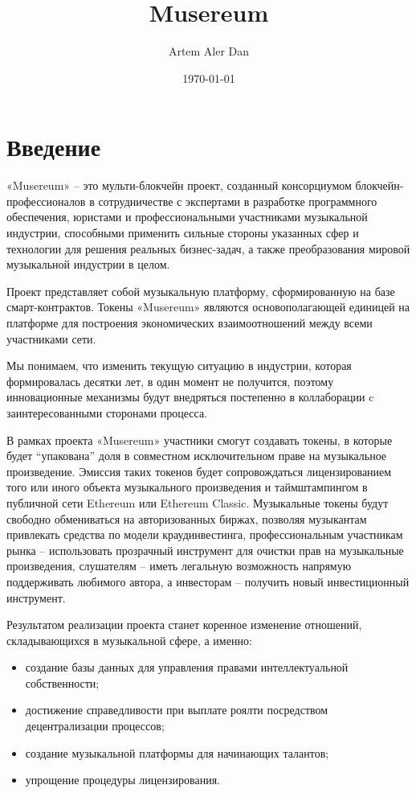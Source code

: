 \documentclass[12pt]{report}
\title{Musereum}
\author{Artem Aler Dan}
\date{\today}
\newcommand{\hlc}[1]{\colorbox{yellow!25}{#1}}
\begin{document}
\maketitle
\pagebreak
\tableofcontents
\pagebreak

\chapter{Введение}
\label{overview}
\begin{multicols}{2}
\hlc{«Musereum»} – это мульти-блокчейн проект, созданный консорциумом блокчейн-профессионалов в сотрудничестве с экспертами в разработке программного обеспечения, юристами и профессиональными участниками музыкальной индустрии, способными применить сильные стороны указанных сфер и технологии для решения реальных бизнес-задач, а также преобразования мировой музыкальной индустрии в целом.

Проект представляет собой музыкальную платформу, сформированную на базе смарт-контрактов. Токены «Musereum» являются основополагающей единицей на платформе для построения экономических взаимоотношений между всеми участниками сети.

Мы понимаем, что изменить текущую ситуацию в индустрии, которая формировалась десятки лет, в один момент не получится, поэтому инновационные механизмы будут внедряться постепенно в коллаборации c заинтересованными сторонами процесса. 

В рамках проекта «Musereum» участники смогут создавать токены, в которые будет “упакована” доля в совместном исключительном праве на музыкальное произведение. Эмиссия таких токенов будет сопровождаться лицензированием того или иного объекта музыкального произведения и таймштампингом в публичной сети Ethereum или Ethereum Classic. Музыкальные токены будут свободно обмениваться на авторизованных биржах, позволяя музыкантам привлекать средства по модели краудинвестинга, профессиональным участникам рынка – использовать прозрачный инструмент для очистки прав на музыкальные произведения, слушателям – иметь легальную возможность напрямую поддерживать любимого автора, а инвесторам – получить новый инвестиционный инструмент.

Результатом реализации проекта станет коренное изменение отношений, складывающихся в музыкальной сфере, а именно:

\begin{itemize}
	\item создание базы данных для управления правами интеллектуальной собственности;
	\item достижение справедливости при выплате роялти посредством децентрализации процессов;
	\item создание музыкальной платформы для начинающих талантов;
	\item упрощение процедуры лицензирования.
\end{itemize}
\end{multicols}
\end{document}
